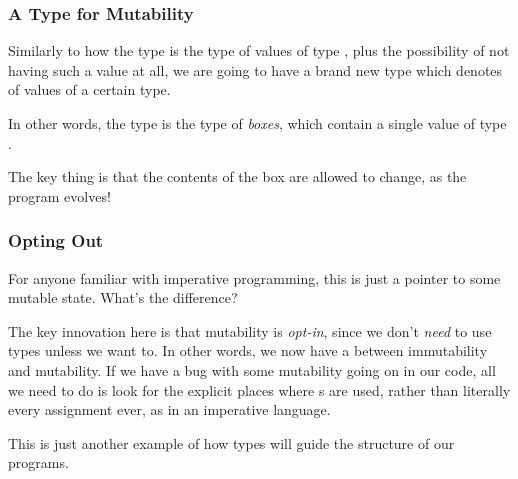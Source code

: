\documentclass[aspectratio=169, handout]{beamer}
\begin{document}

\begin{frame}[fragile]
  \frametitle{A Type for Mutability}

  Similarly to how the type  is the type of values of type ,
  plus the possibility of not having such a value at all, we are going to have a
  brand new type which denotes  of values of a certain type.

  \pause
  \vspace{\fill}


  \pause
  \vspace{\fill}

  In other words, the type  is the type of \textit{boxes}, which contain
  a single value of type .

  \vspace{\fill}

  \begin{center}
  \end{center}

  \pause
  \vspace{\fill}

  The key thing is that the contents of the box are allowed to change, as the
  program evolves!
\end{frame}

\begin{frame}[fragile]
  \frametitle{Opting Out}

  \tgs

  For anyone familiar with imperative programming, this is just a pointer to
  some mutable state. What's the difference?

  \pause
  \vspace{\fill}

  The key innovation here is that mutability is \textit{opt-in}, since we don't
  \textit{need} to use  types unless we want to. In other words, we now
  have a  between immutability and mutability. If we
  have a bug with some mutability going on in our code, all we need to do is look
  for the explicit places where s are used, rather than literally every
  assignment ever, as in an imperative language.

  \pause
  \vspace{\fill}

  This is just another example of how types will guide the structure of our programs.
\end{frame}
\end{document}
